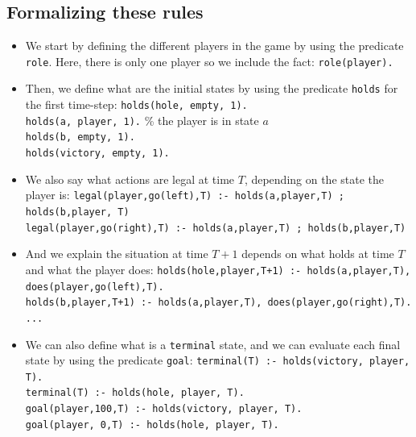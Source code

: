 \subsection{Formalizing these rules}

\begin{itemize}



\item We start by defining the different players in the game by using the predicate \texttt{role}. Here, there is only one player so we include the fact: \texttt{role(player).}

\smallskip

\item Then, we define what are the initial states by using the predicate \texttt{holds} for the first time-step:\newline
\texttt{holds(hole, empty, 1).}\\
\texttt{holds(a, player, 1).} \% the player is in state $a$\\
\texttt{holds(b, empty, 1).}\\
\texttt{holds(victory, empty, 1).}

\item We also say what actions are legal at time $T$, depending on the state the player is:\newline
\texttt{legal(player,go(left),T) :- holds(a,player,T) ; holds(b,player, T)}\\
\texttt{legal(player,go(right),T) :- holds(a,player,T) ; holds(b,player,T)}

\item And we explain the situation at time $T+1$ depends on what holds at time $T$ and what the player does:\newline
\texttt{holds(hole,player,T+1) :- holds(a,player,T), does(player,go(left),T).}\\
\texttt{holds(b,player,T+1) :- holds(a,player,T), does(player,go(right),T).}\\
\texttt{...}

\item We can also define what is a \texttt{terminal} state, and we can evaluate each final state by using the predicate \texttt{goal}: \newline
\texttt{terminal(T) :- holds(victory, player, T).}\\
\texttt{terminal(T) :- holds(hole, player, T).}\\
\texttt{goal(player,100,T) :- holds(victory, player, T).}\\
\texttt{goal(player,  0,T) :- holds(hole, player, T).}
\end{itemize}

